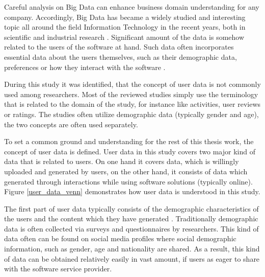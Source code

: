 Careful analysis on Big Data can enhance business domain understanding for any company. Accordingly, Big Data has became a widely studied and interesting topic all around the field Information Technology in the recent years, both in scientific and industrial research \cite{inmon2007tapping, introtodatamining}. Significant amount of the data is somehow related to the users of the software at hand. Such data often incorporates essential data about the users themselves, such as their demographic data, preferences or how they interact with the software 
\cite{jang2015noreciprocity, hu2014we, jang2016teensengagemorewithfewerphotos, han2016teensarefrommars, socialdiversityongithub}.


During this study it was identified, that the concept of user data is not commonly used among researchers. Most of the reviewed studies simply use the terminology that is related to the domain of the study, for instance like activities, user reviews or ratings. The studies often utilize demographic data (typically gender and age), the two concepts are often used separately. 

To set a common ground and understanding for the rest of this thesis work, the concept of user data is defined. User data in this study covers two major kind of data that is related to users. On one hand it covers data, which is willingly uploaded and generated by users, on the other hand, it consists of data which generated through interactions while using software solutions (typically online). Figure \ref{user_data_venn} demonstrates how user data is understood in this study.

The first part of user data typically consists of the demographic characteristics of the users and the content which they have generated \cite{han2016teensarefrommars}. Traditionally demographic data is often collected via surveys and questionnaires by researchers. This kind of data often can be found on social media profiles where social demographic information, such as gender, age and nationality are shared. As a result, this kind of data can be obtained relatively easily in vast amount, if users as eager to share with the software service provider.

